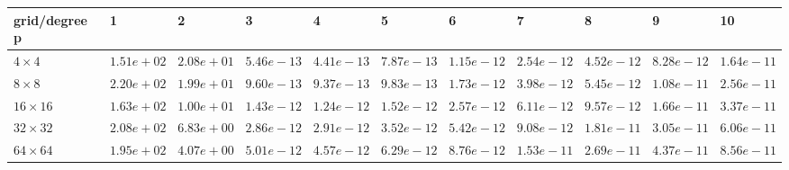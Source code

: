 \begin{tabular}{lllllllllll}
\hline
 grid/degree p   & 1          & 2          & 3          & 4          & 5          & 6          & 7          & 8          & 9          & 10         \\
\hline
 $4 \times 4$    & $1.51e+02$ & $2.08e+01$ & $5.46e-13$ & $4.41e-13$ & $7.87e-13$ & $1.15e-12$ & $2.54e-12$ & $4.52e-12$ & $8.28e-12$ & $1.64e-11$ \\
 $8 \times 8$    & $2.20e+02$ & $1.99e+01$ & $9.60e-13$ & $9.37e-13$ & $9.83e-13$ & $1.73e-12$ & $3.98e-12$ & $5.45e-12$ & $1.08e-11$ & $2.56e-11$ \\
 $16 \times 16$  & $1.63e+02$ & $1.00e+01$ & $1.43e-12$ & $1.24e-12$ & $1.52e-12$ & $2.57e-12$ & $6.11e-12$ & $9.57e-12$ & $1.66e-11$ & $3.37e-11$ \\
 $32 \times 32$  & $2.08e+02$ & $6.83e+00$ & $2.86e-12$ & $2.91e-12$ & $3.52e-12$ & $5.42e-12$ & $9.08e-12$ & $1.81e-11$ & $3.05e-11$ & $6.06e-11$ \\
 $64 \times 64$  & $1.95e+02$ & $4.07e+00$ & $5.01e-12$ & $4.57e-12$ & $6.29e-12$ & $8.76e-12$ & $1.53e-11$ & $2.69e-11$ & $4.37e-11$ & $8.56e-11$ \\
\hline
\end{tabular}